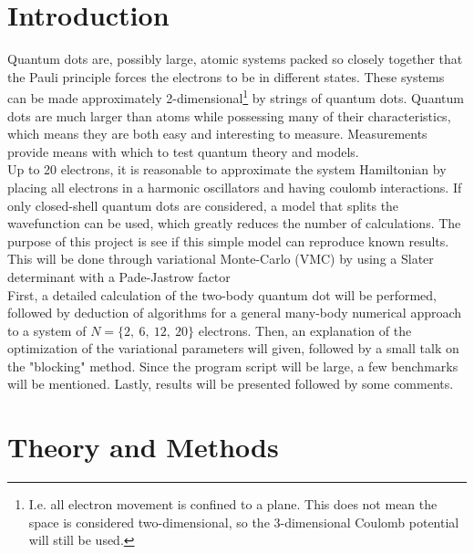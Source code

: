 \documentclass[english, a4paper]{article}
\begin{document}
	\begin{abstract}
		
	\end{abstract}
	
	
	\tableofcontents
	\newpage
	
	
	\section{Introduction}
	Quantum dots are, possibly large, atomic systems packed so closely together that the Pauli principle forces the electrons to be in different states. These systems can be made approximately 2-dimensional\footnote{I.e. all electron movement is confined to a plane. This does not mean the space is considered two-dimensional, so the 3-dimensional Coulomb potential will still be used.} by strings of quantum dots. Quantum dots are much larger than atoms while possessing many of their characteristics, which means they are both easy and interesting to measure. Measurements provide means with which to test quantum theory and models.\\
	Up to 20 electrons, it is reasonable to approximate the system Hamiltonian by placing all electrons in a harmonic oscillators and having coulomb interactions. If only closed-shell quantum dots are considered, a model that splits the wavefunction can be used, which greatly reduces the number of calculations. The purpose of this project is see if this simple model can reproduce known results. This will be done through variational Monte-Carlo (VMC) by using a Slater determinant with a Pade-Jastrow factor\\
	First, a detailed calculation of the two-body quantum dot will be performed, followed by deduction of algorithms for a general many-body numerical approach to a system of $N=\{2,\:6,\:12,\:20\}$ electrons. Then, an explanation of the optimization of the variational parameters will given, followed by a small talk on the "blocking" method. Since the program script will be large, a few benchmarks will be mentioned. Lastly, results will be presented followed by some comments.
	
	\section{Theory and Methods}
\end{document}

